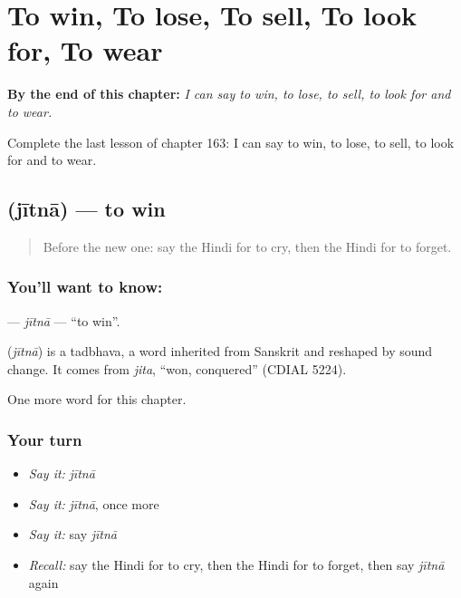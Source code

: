 
\chapter{To win, To lose, To sell, To look for, To wear}
\label{ch:hi-to-win-to-lose-to-sell-to-look-for-to-wear}

\begin{chapteropening}
\textbf{By the end of this chapter:} \emph{I can say to win, to lose, to sell, to look for and to wear.}

Complete the last lesson of chapter 163: I can say to win, to lose, to sell, to look for and to wear.
\end{chapteropening}

\section[\texorpdfstring{\hi{जीतना} (jītnā)}{जीतना (jītnā)}]{ (jītnā) — to win}

\label{lesson:HI-C163-jitna}



\begin{quote}
Before the new one: say the Hindi for to cry, then the Hindi for to forget.
\end{quote}

\subsection*{You'll want to know: }
\textbf{} — \emph{jītnā} — \textquotedblleft{}to win\textquotedblright{}.

\begin{cousinweb}
\textbf{} (\emph{jītnā}) is a tadbhava, a word inherited from Sanskrit and reshaped by sound change. It comes from \emph{jita}, \textquotedblleft{}won, conquered\textquotedblright{} (CDIAL 5224).
\end{cousinweb}

\begin{grammarlens}[title={What you've built}]
One more word for this chapter.
\end{grammarlens}

\subsection*{Your turn}
\begin{itemize}
\raggedright
  \item \emph{Say it:} \emph{jītnā}
  \item \emph{Say it:} \emph{jītnā}, once more
  \item \emph{Say it:} say \emph{jītnā}
  \item \emph{Recall:} say the Hindi for to cry, then the Hindi for to forget, then say \emph{jītnā} again
\end{itemize}

